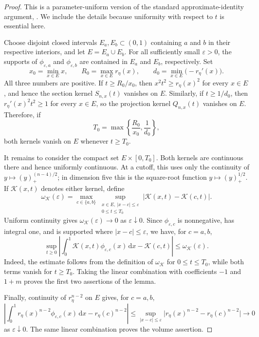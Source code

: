 \documentclass[11pt]{article}
\theoremstyle{remark}
\newcommand{\dd}{\,\mathrm{d}}
\newcommand{\pos}[1]{(#1)_{+}}
\begin{document}
\begin{proof}
This is a parameter-uniform version of the standard approximate-identity
argument, \cite[Theorem~8.14]{Folland}.  We include the details
because uniformity with respect to $t$ is essential here.

Choose disjoint closed intervals $E_a,E_b\subset(0,1)$ containing $a$ and
$b$ in their respective interiors, and let $E=E_a\cup E_b$.  For all
sufficiently small $\varepsilon>0$, the supports of
$\phi_{\varepsilon,a}$ and $\phi_{\varepsilon,b}$ are contained in $E_a$
and $E_b$, respectively.  Set
\[
 x_0=\min_{x\in E}x,
 \qquad R_0=\max_{x\in E}r_\eta(x),
 \qquad d_0=\min_{x\in E}\bigl(-r_\eta'(x)\bigr).
\]
All three numbers are positive.  If $t\geq R_0/x_0$, then
$x^2t^2\geq r_\eta(x)^2$ for every $x\in E$, and hence the section kernel
$S_{n,x}(t)$ vanishes on $E$.  Similarly, if $t\geq1/d_0$, then
$r_\eta'(x)^2t^2\geq1$ for every $x\in E$, so the projection kernel
$Q_{n,x}(t)$ vanishes on $E$.  Therefore, if
\[
 T_0=\max\left\{\frac{R_0}{x_0},\frac1{d_0}\right\},
\]
both kernels vanish on $E$ whenever $t\geq T_0$.

It remains to consider the compact set $E\times[0,T_0]$.  Both kernels are
continuous there and hence uniformly continuous.  At a cutoff, this uses
only the continuity of $y\mapsto\pos{y}^{(n-4)/2}$; in dimension five this
is the square-root function $y\mapsto\pos{y}^{1/2}$.  If
$\mathcal K(x,t)$ denotes either kernel, define
\[
 \omega_{\mathcal K}(\varepsilon)
 =\max_{c\in\{a,b\}}
  \sup_{\substack{x\in E,\ |x-c|\leq\varepsilon\\0\leq t\leq T_0}}
  \bigl|\mathcal K(x,t)-\mathcal K(c,t)\bigr|.
\]
Uniform continuity gives
$\omega_{\mathcal K}(\varepsilon)\to0$ as $\varepsilon\downarrow0$.
Since $\phi_{\varepsilon,c}$ is nonnegative, has integral one, and is
supported where $|x-c|\leq\varepsilon$, we have, for $c=a,b$,
\[
 \sup_{t\geq0}\left|
  \int_0^1\mathcal K(x,t)\phi_{\varepsilon,c}(x)\dd x
  -\mathcal K(c,t)
 \right|
 \leq\omega_{\mathcal K}(\varepsilon).
\]
Indeed, the estimate follows from the definition of
$\omega_{\mathcal K}$ for $0\leq t\leq T_0$, while both terms vanish for
$t\geq T_0$.  Taking the linear combination with coefficients $-1$ and
$1+m$ proves the first two assertions of the lemma.

Finally, continuity of $r_\eta^{n-2}$ on $E$ gives, for $c=a,b$,
\[
 \left|
  \int_0^1r_\eta(x)^{n-2}\phi_{\varepsilon,c}(x)\dd x
  -r_\eta(c)^{n-2}
 \right|
 \leq
 \sup_{|x-c|\leq\varepsilon}
 \bigl|r_\eta(x)^{n-2}-r_\eta(c)^{n-2}\bigr|
 \longrightarrow0
\]
as $\varepsilon\downarrow0$.  The same linear combination proves the
volume assertion.
\end{proof}
\end{document}
